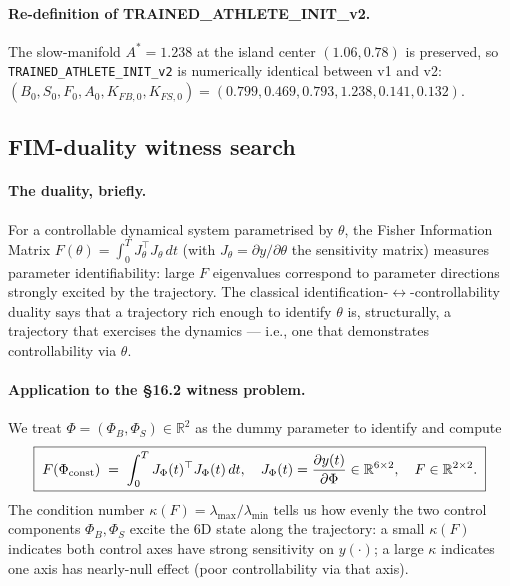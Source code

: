 \documentclass[11pt,a4paper]{article}
\theoremstyle{definition}
\begin{document}
\paragraph{Re-definition of TRAINED\_ATHLETE\_INIT\_v2.} The slow-manifold $A^* = 1.238$ at the island center $(1.06, 0.78)$ is preserved, so \texttt{TRAINED\_ATHLETE\_INIT\_v2} is numerically identical between v1 and v2: $(B_0, S_0, F_0, A_0, K_{FB,0}, K_{FS,0}) = (0.799, 0.469, 0.793, 1.238, 0.141, 0.132)$.

\subsection{FIM-duality witness search}

\paragraph{The duality, briefly.} For a controllable dynamical system parametrised by $\theta$, the Fisher Information Matrix $F(\theta) = \int_0^T J_\theta^\top J_\theta \, dt$ (with $J_\theta = \partial y / \partial \theta$ the sensitivity matrix) measures parameter identifiability: large $F$ eigenvalues correspond to parameter directions strongly excited by the trajectory. The classical identification-$\leftrightarrow$-controllability duality says that a trajectory rich enough to identify $\theta$ is, structurally, a trajectory that exercises the dynamics — i.e., one that demonstrates controllability via $\theta$.

\paragraph{Application to the §16.2 witness problem.} We treat $\Phi = (\Phi_B, \Phi_S) \in \mathbb{R}^2$ as the dummy parameter to identify and compute
\[
\boxed{\;
F(\Phi_{\rm const}) \;=\; \int_0^T J_\Phi(t)^\top J_\Phi(t) \, dt, \quad J_\Phi(t) = \frac{\partial y(t)}{\partial \Phi} \in \mathbb{R}^{6 \times 2}, \quad F \in \mathbb{R}^{2 \times 2}.
\;}
\]
The condition number $\kappa(F) = \lambda_{\max} / \lambda_{\min}$ tells us how evenly the two control components $\Phi_B, \Phi_S$ excite the 6D state along the trajectory: a small $\kappa(F)$ indicates both control axes have strong sensitivity on $y(\cdot)$; a large $\kappa$ indicates one axis has nearly-null effect (poor controllability via that axis).
\end{document}
